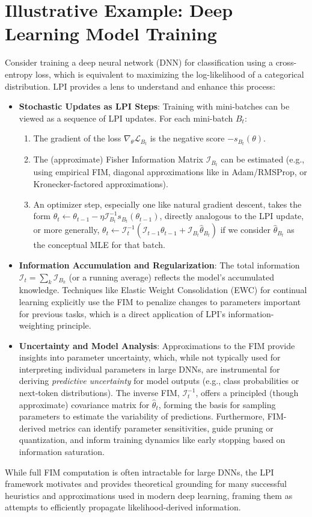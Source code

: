 \documentclass[11pt]{article}
\begin{document}
\section{Illustrative Example: Deep Learning Model Training}
Consider training a deep neural network (DNN) for classification using a cross-entropy loss, which is equivalent to maximizing the log-likelihood of a categorical distribution. LPI provides a lens to understand and enhance this process:

\begin{itemize}
  \item \textbf{Stochastic Updates as LPI Steps}: Training with mini-batches can be viewed as a sequence of LPI updates. For each mini-batch $B_t$:
  \begin{enumerate}
    \item The gradient of the loss $\nabla_\theta \mathcal{L}_{B_t}$ is the negative score $-s_{B_t}(\theta)$.
    \item The (approximate) Fisher Information Matrix $\mathcal{I}_{B_t}$ can be estimated (e.g., using empirical FIM, diagonal approximations like in Adam/RMSProp, or Kronecker-factored approximations).
    \item An optimizer step, especially one like natural gradient descent, takes the form $\theta_{t} \leftarrow \theta_{t-1} - \eta \mathcal{I}_{B_t}^{-1} s_{B_t}(\theta_{t-1})$, directly analogous to the LPI update, or more generally, $\theta_t \leftarrow \mathcal{I}_t^{-1}(\mathcal{I}_{t-1}\theta_{t-1} + \mathcal{I}_{B_t}\hat\theta_{B_t})$ if we consider $\hat\theta_{B_t}$ as the conceptual MLE for that batch.
  \end{enumerate}
  \item \textbf{Information Accumulation and Regularization}: The total information $\mathcal{I}_t = \sum_k \mathcal{I}_{B_k}$ (or a running average) reflects the model's accumulated knowledge. Techniques like Elastic Weight Consolidation (EWC) \cite{kirkpatrick2017overcoming} for continual learning explicitly use the FIM to penalize changes to parameters important for previous tasks, which is a direct application of LPI's information-weighting principle.
  \item \textbf{Uncertainty and Model Analysis}: Approximations to the FIM provide insights into parameter uncertainty, which, while not typically used for interpreting individual parameters in large DNNs, are instrumental for deriving \textit{predictive uncertainty} for model outputs (e.g., class probabilities or next-token distributions). The inverse FIM, $\mathcal{I}_t^{-1}$, offers a principled (though approximate) covariance matrix for $\hat{\theta}_t$, forming the basis for sampling parameters to estimate the variability of predictions. Furthermore, FIM-derived metrics can identify parameter sensitivities, guide pruning or quantization, and inform training dynamics like early stopping based on information saturation.
\end{itemize}
While full FIM computation is often intractable for large DNNs, the LPI framework motivates and provides theoretical grounding for many successful heuristics and approximations used in modern deep learning, framing them as attempts to efficiently propagate likelihood-derived information.
\end{document}
